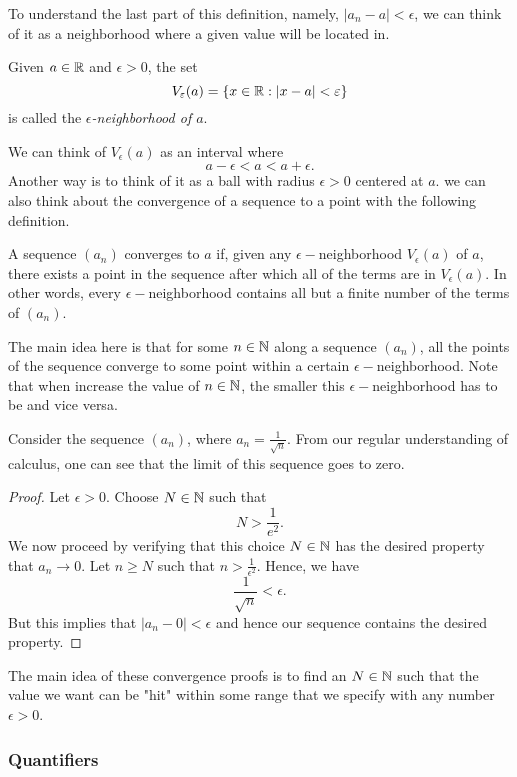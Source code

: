 To understand the last part of this definition, namely, \( |a_n - a| < \epsilon \), we can think of it as a neighborhood where a given value will be located in. 
\begin{definition}
Given \( a \in \mathbb{R} \) and \( \epsilon  > 0 \), the set 
\[ V_{  \varepsilon }(a) = \{ x \in \mathbb{R} : |x-a| < \varepsilon  \}\]
is called the \textit{\( \epsilon \)-neighborhood of \( a \)}. 
\end{definition}
We can think of \( V_{ \epsilon }(a)\) as an interval where 
\[ a - \epsilon < a < a + \epsilon.\]
Another way is to think of it as a ball with radius \( \epsilon > 0\) centered at \( a \). 
we can also think about the convergence of a sequence to a point with the following definition.
\begin{definition}
    A sequence \( (a_n) \) converges to \( a \) if, given any \( \epsilon-\)neighborhood \( V_{ \epsilon } (a)\) of \( a \), there exists a point in the sequence after which all of the terms are in \( V_{ \epsilon } (a) \). In other words, every \( \epsilon - \)neighborhood contains all but a finite number of the terms of \( (a_n) \). 
\end{definition}

The main idea here is that for some \( n \in \mathbb{N} \) along a sequence \( (a_n) \), all the points of the sequence converge to some point within a certain \( \epsilon -\)neighborhood. Note that when increase the value of \( n \in \mathbb{N} \), the smaller this \( \epsilon-\)neighborhood has to be and vice versa.

Consider the sequence \( (a_n) \), where \( a_n = \frac{1}{ \sqrt{n} }\). From our regular understanding of calculus, one can see that the limit of this sequence goes to zero. 

%
\begin{proof}
Let \( \epsilon  > 0 \). Choose \( N \in \mathbb{N} \) such that 
\[ N > \frac{1}{e^2}.\]
We now proceed by verifying that this choice \( N \in \mathbb{N} \) has the desired property that \( a_n \to 0 \). Let \( n \geq N \) such that \( n > \frac{1}{ \epsilon^2} \). Hence, we have 
\[ \frac{1}{ \sqrt{n}} < \epsilon. \]
But this implies that \( |a_n - 0| < \epsilon \) and hence our sequence contains the desired property. 
\end{proof}
The main idea of these convergence proofs is to find an \( N \in \mathbb{N} \) such that the value we want can be "hit" within some range that we specify with any number \( \epsilon > 0   \).


\subsubsection{Quantifiers}

